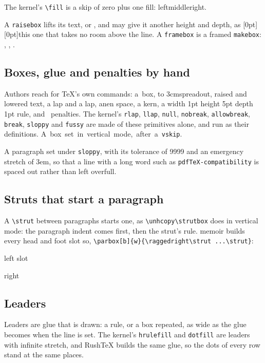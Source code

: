 \documentclass{article}
\numberwithin{equation}{section}
\theoremstyle{definition}
\theoremstyle{remark}
\begin{document}
\noindent The kernel's \texttt{\textbackslash fill} is a skip of zero plus one fill:
left\hspace{\fill}middle\hspace*{\fill}right.
\vspace{\fill}

\noindent A \texttt{raisebox} lifts its text,  or
, and may give it another height and
depth, as \raisebox{1.5ex}[0pt][0pt]{this one} that takes no room above the line.
A \texttt{framebox} is a framed \texttt{makebox}: ,
, .

\subsection{Boxes, glue and penalties by hand}
Authors reach for \TeX's own commands: \hbox{a box}, \hbox to 3cm{spread\hfil out},
\raise 2pt\hbox{raised} and \lower 1pt\hbox{lowered} text, a \rlap{\_\_}lap and a
\llap{\_\_}lap, an\enspace en space, a \kern 3pt kern, a \vrule width 1pt height 5pt
depth 1pt rule, and \nobreak\ penalties. The kernel's \texttt{rlap}, \texttt{llap},
\texttt{null}, \texttt{nobreak}, \texttt{allowbreak}, \texttt{break}, \texttt{sloppy} and
\texttt{fussy} are made of these primitives alone, and run as their definitions.
\hbox{A box set in vertical mode, after a \texttt{vskip}.}
\vskip 6pt
{\sloppy A paragraph set under \texttt{sloppy}, with its tolerance of 9999 and an emergency
stretch of 3em, so that a line with a long word such as \texttt{pdfTeX-compatibility} is
spaced out rather than left overfull.\par}

\subsection{Struts that start a paragraph}\label{sec:strut}
\strut A \verb|\strut| between paragraphs starts one, as \verb|\unhcopy\strutbox| does in
vertical mode: the paragraph indent comes first, then the strut's rule. memoir builds every
head and foot slot so, \verb|\parbox[b]{w}{\raggedright\strut ...\strut}|:
\parbox[b]{8em}{\raggedright\strut left slot\strut}\hfill
\parbox[b]{8em}{\centering\strut\strut}\hfill
\parbox[b]{8em}{\raggedleft\strut right\strut}

\subsection{Leaders}\label{sec:leaders}
Leaders are glue that is drawn: a rule, or a box repeated, as wide as the glue becomes
when the line is set. The kernel's \texttt{hrulefill} and \texttt{dotfill} are leaders
with infinite stretch, and RushTeX builds the same glue, so the dots of every row stand
at the same places.
\end{document}
